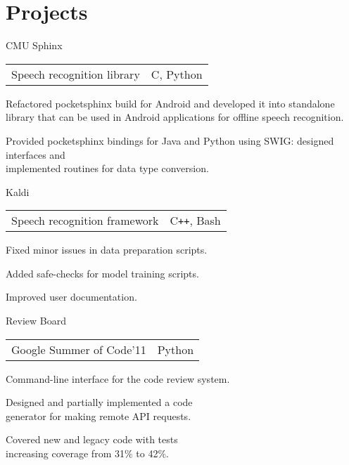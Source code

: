 \documentclass[11pt,a4paper]{article}
\begin{document}
\section{Projects}
\begin{multicols}{2}
  \raggedcolumns

  \begin{project2}{CMU Sphinx}{\begin{tabular}{@{}l|l}Speech recognition library & C, Python\\\end{tabular}}
    \begin{items}
    \item Refactored pocketsphinx build for Android and developed it into
      standalone library that can be used in Android applications for offline
      speech recognition.
    \item Provided pocketsphinx bindings for Java and Python using SWIG:
      designed interfaces and\\implemented routines for data type conversion.
    \end{items}
  \end{project2}

  \begin{project2}{Kaldi}{\begin{tabular}{@{}l|l}Speech recognition framework & C\texttt{++}, Bash\\\end{tabular}}
    \begin{items}
    \item Fixed minor issues in data preparation scripts.
    \item Added safe-checks for model training scripts.
    \item Improved user documentation.
    \end{items}
  \end{project2}

  \columnbreak

  \begin{project2}{Review Board}{\begin{tabular}{@{}l|l}Google Summer of Code'11 & Python\\\end{tabular}}
    Command-line interface for the code review system.
    \begin{items}
    \item Designed and partially implemented a code\\generator for making
      remote API requests.
    \item Covered new and legacy code with tests\\increasing coverage from
      31$\%$ to 42$\%$.
    \end{items}
  \end{project2}


\end{multicols}
\end{document}

